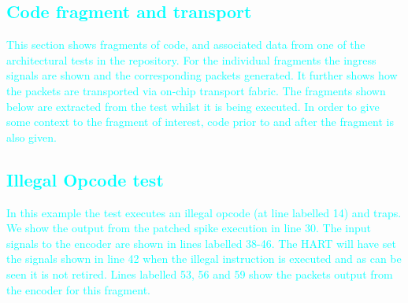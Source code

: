 \textcolor{cyan}
{\chapter{Code fragment and transport}}

\textcolor{cyan}{This section shows fragments of code, and associated data from one of the
architectural tests in the repository. For the individual fragments
the ingress signals are shown and the corresponding packets
generated. It further shows how the packets are transported via on-chip
transport fabric.
The fragments shown below are extracted from the test whilst it is
being executed. In order to give some context to the fragment of
interest, code prior to and after the fragment is also given.  
}
  
\textcolor{cyan}{\section {Illegal Opcode test}}

\textcolor{cyan}{In this example the test executes an illegal opcode (at line labelled 14) and
traps. We show the output from the patched spike execution in line 30.
The input signals to the encoder are shown in lines labelled 38-46. The HART
will have set the signals shown in line 42 when the illegal
instruction is executed and as can be seen it is not retired.
Lines labelled 53, 56 and 59 show the packets output from the encoder for this fragment.
}

